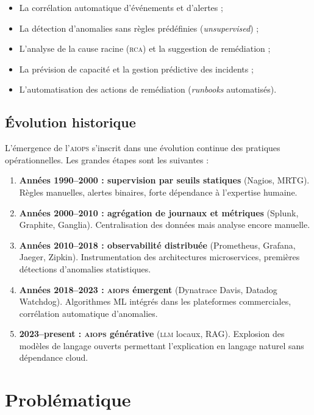 \begin{itemize}
  \item La corrélation automatique d'événements et d'alertes ;
  \item La détection d'anomalies sans règles prédéfinies (\textit{unsupervised}) ;
  \item L'analyse de la cause racine (\textsc{rca}) et la suggestion de remédiation ;
  \item La prévision de capacité et la gestion prédictive des incidents ;
  \item L'automatisation des actions de remédiation (\textit{runbooks} automatisés).
\end{itemize}

\subsection{Évolution historique}

L'émergence de l'\textsc{aiops} s'inscrit dans une évolution continue des pratiques
opérationnelles. Les grandes étapes sont les suivantes :

\begin{enumerate}
  \item \textbf{Années 1990--2000 : supervision par seuils statiques} (Nagios, MRTG).
    Règles manuelles, alertes binaires, forte dépendance à l'expertise humaine.
  \item \textbf{Années 2000--2010 : agrégation de journaux et métriques} (Splunk,
    Graphite, Ganglia). Centralisation des données mais analyse encore manuelle.
  \item \textbf{Années 2010--2018 : observabilité distribuée} (Prometheus, Grafana,
    Jaeger, Zipkin). Instrumentation des architectures microservices, premières
    détections d'anomalies statistiques.
  \item \textbf{Années 2018--2023 : \textsc{aiops} émergent} (Dynatrace Davis,
    Datadog Watchdog). Algorithmes ML intégrés dans les plateformes commerciales,
    corrélation automatique d'anomalies.
  \item \textbf{2023--present : \textsc{aiops} générative} (\textsc{llm} locaux,
    RAG). Explosion des modèles de langage ouverts permettant l'explication en
    langage naturel sans dépendance cloud.
\end{enumerate}

\section{Problématique}


